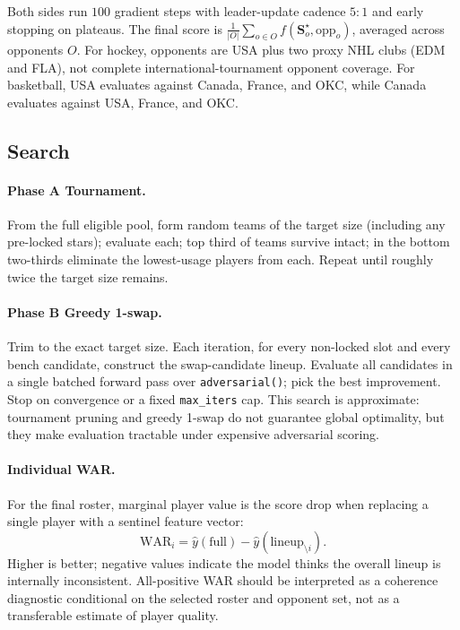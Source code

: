 \documentclass[11pt,letterpaper]{article}
\begin{document}
Both sides run $100$ gradient steps with leader-update cadence $5{:}1$
and early stopping on plateaus. The final score is
$\frac{1}{|O|}\sum_{o \in O} f(\mathbf{S}^{\star}_o, \text{opp}_o)$,
averaged across opponents $O$. For hockey, opponents are USA plus two
proxy NHL clubs (EDM and FLA), not complete international-tournament
opponent coverage. For basketball, USA evaluates against Canada,
France, and OKC, while Canada evaluates against USA, France, and OKC.

\subsection{Search}

\paragraph{Phase A Tournament.} From the full eligible pool, form
random teams of the target size (including any pre-locked stars);
evaluate each; top third of teams survive intact; in the bottom
two-thirds eliminate the lowest-usage players from each. Repeat until
roughly twice the target size remains.

\paragraph{Phase B Greedy 1-swap.} Trim to the exact target size.
Each iteration, for every non-locked slot and every bench candidate,
construct the swap-candidate lineup. Evaluate all candidates in a
single batched forward pass over \texttt{adversarial()}; pick the best
improvement. Stop on convergence or a fixed \texttt{max\_iters} cap.
This search is approximate: tournament pruning and greedy 1-swap do not
guarantee global optimality, but they make evaluation tractable under
expensive adversarial scoring.

\paragraph{Individual WAR.} For the final roster, marginal player value
is the score drop when replacing a single player with a sentinel
feature vector:
\[
  \mathrm{WAR}_i = \hat{y}(\text{full})
  - \hat{y}(\text{lineup}_{\setminus i}).
\]
Higher is better; negative values indicate the model thinks the
overall lineup is internally inconsistent.
All-positive WAR should be interpreted as a coherence diagnostic
conditional on the selected roster and opponent set, not as a
transferable estimate of player quality.
\end{document}
